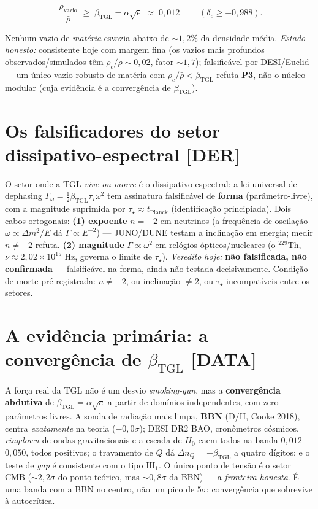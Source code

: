 \documentclass[11pt]{article}
\newcommand{\bTGL}{\beta_{\mathrm{TGL}}}\newcommand{\Msun}{M_{\odot}}\newcommand{\TGL}{\mathrm{TGL}}
\theoremstyle{definition}\newtheorem{deriv}{Derivação}
\begin{document}
\begin{equation}\boxed{\;\frac{\rho_{\mathrm{vazio}}}{\bar\rho}\;\geq\;\bTGL=\alpha\sqrt{e}\;\approx\;0{,}012\;}\qquad(\delta_c\geq-0{,}988).\end{equation}

Nenhum vazio de \emph{matéria} esvazia abaixo de $\sim1{,}2\%$ da densidade média. \emph{Estado honesto:} consistente hoje com margem fina (os vazios mais profundos observados/simulados têm $\rho_c/\bar\rho\sim0{,}02$, fator $\sim1{,}7$); falsificável por DESI/Euclid --- um único vazio robusto de matéria com $\rho_c/\bar\rho<\bTGL$ refuta \textbf{P3}, não o núcleo modular (cuja evidência é a convergência de $\bTGL$).

\section{Os falsificadores do setor dissipativo-espectral \textsf{[DER]}}

O setor onde a TGL \emph{vive ou morre} é o dissipativo-espectral: a lei universal de dephasing $\Gamma_\omega=\tfrac12\bTGL\tau_\star\omega^2$ tem assinatura falsificável de \textbf{forma} (parâmetro-livre), com a magnitude suprimida por $\tau_\star\approx t_{\mathrm{Planck}}$ (identificação principiada). Dois cabos ortogonais: \textbf{(1) expoente} $n=-2$ em neutrinos (a frequência de oscilação $\omega\propto\Delta m^2/E$ dá $\Gamma\propto E^{-2}$) --- JUNO/DUNE testam a inclinação em energia; medir $n\neq-2$ refuta. \textbf{(2) magnitude} $\Gamma\propto\omega^2$ em relógios ópticos/nucleares (o $^{229}$Th, $\nu\approx2{,}02\times10^{15}$ Hz, governa o limite de $\tau_\star$). \emph{Veredito hoje:} \textbf{não falsificada, não confirmada} --- falsificável na forma, ainda não testada decisivamente. Condição de morte pré-registrada: $n\neq-2$, ou inclinação $\neq2$, ou $\tau_\star$ incompatíveis entre os setores.

\section{A evidência primária: a convergência de $\bTGL$ \textsf{[DATA]}}

A força real da TGL não é um desvio \emph{smoking-gun}, mas a \textbf{convergência abdutiva} de $\bTGL=\alpha\sqrt{e}$ a partir de domínios independentes, com zero parâmetros livres. A sonda de radiação mais limpa, \textbf{BBN} (D/H, Cooke 2018), centra \emph{exatamente} na teoria ($-0{,}0\sigma$); DESI DR2 BAO, cronômetros cósmicos, \emph{ringdown} de ondas gravitacionais e a escada de $H_0$ caem todos na banda $0{,}012$--$0{,}050$, todos positivos; o travamento de $Q$ dá $\Delta n_Q=-\bTGL$ a quatro dígitos; e o teste de \emph{gap} é consistente com o tipo $\mathrm{III}_1$. O único ponto de tensão é o setor CMB ($\sim2{,}2\sigma$ do ponto teórico, mas $\sim0{,}8\sigma$ da BBN) --- a \emph{fronteira honesta}. É uma banda com a BBN no centro, não um pico de $5\sigma$: convergência que sobrevive à autocrítica.
\end{document}
